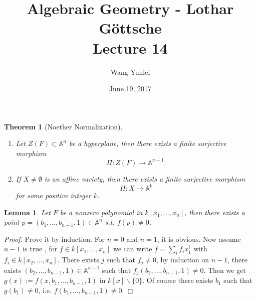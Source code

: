 \documentclass{amsart}
\theoremstyle{plain}
\newtheorem{theorem}{Theorem}
\newtheorem{lemma}{Lemma}
\theoremstyle{definition}
\theoremstyle{remark}
\numberwithin{equation}{section}
\begin{document}
\title[Complete-simple distributive lattices]
{Algebraic Geometry - Lothar G\"{o}ttsche \\
	Lecture 14}
\author{Wang Yunlei}
\date{June 19, 2017}
 
\maketitle
\begin{theorem}[Noether Normalization]\label{14-1}
	\begin{enumerate}
		\item Let $ Z(F) \subset \mathbb{A}^n$ be a hyperplane, then there exists a finite surjective morphism
		$$
		\Pi:Z(F)\to \mathbb{A}^{n-1}.
		$$
		\item If $ X\neq \emptyset  $ is an affine variety, then there exists a finite surjective morphism
		$$
		\Pi:X\to \mathbb{A}^k
		$$
		for some positive integer $ k $.
	\end{enumerate}
\end{theorem}
\begin{lemma}
	Let $ F $ be a nonzero polynomial in $ k[x_1,\dots,x_n] $, then there exists a point $ p=(b_1,\dots,b_{n-1},1)\in\mathbb{A}^n $ s.t. $ f(p)\neq 0 $.
\end{lemma}
\begin{proof}
	Prove it by induction. For $ n=0 $ and $ n=1 $, it is obvious. Now assume $ n-1 $ is true , for $ f\in k[x_1,\dots,x_n] $ we can write $ f=\sum\limits_{i}f_ix_1^i $ with $ f_i\in k[x_2,\dots,x_{n}] $. There exists $ j $ such that $ f_j\neq 0$, by induction on $ n-1 $, there exists $ (b_2,\dots,b_{n-1},1)\in \mathbb{A}^{n-1} $ such that $ f_j(b_2,\dots,b_{n-1},1)\neq 0 $. Then we get $ g(x):=f(x,b_1,\dots,b_{n-1},1) $ in $ k[x]\backslash\lbrace 0 \rbrace $. Of course there exists  $ b_1 $ such that $ g(b_1)\neq 0 $, i.e. $ f(b_1,\dots,b_{n-1},1)\neq 0 $.
\end{proof}
\end{document}
